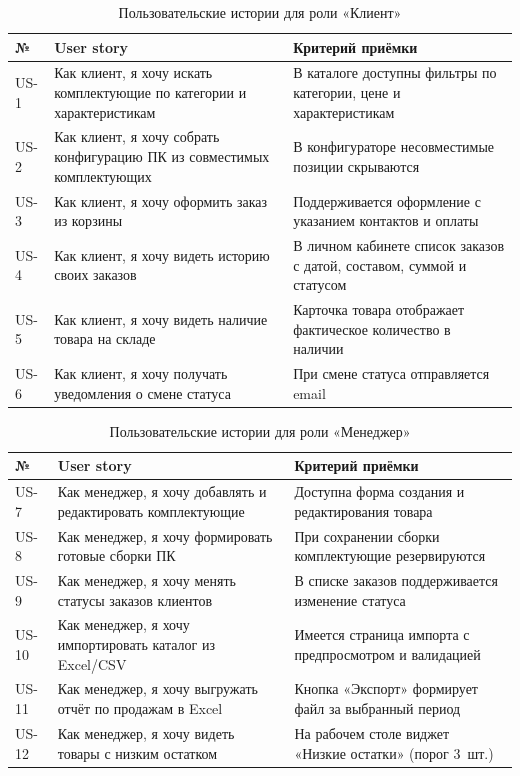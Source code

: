 \begin{table}[ht!]
\caption{Пользовательские истории для роли «Клиент»}
\label{tab:us-cli}
\small
\begin{tabularx}{\textwidth}{|>{\centering\arraybackslash}p{}|>{\RaggedRight\arraybackslash}X|>{\RaggedRight\arraybackslash}X|}
\hline
\textbf{№} & \textbf{User story} & \textbf{Критерий приёмки} \\ \hline
US-1 & Как клиент, я хочу искать комплектующие по категории и характеристикам & В каталоге доступны фильтры по категории, цене и характеристикам \\ \hline
US-2 & Как клиент, я хочу собрать конфигурацию ПК из совместимых комплектующих & В конфигураторе несовместимые позиции скрываются \\ \hline
US-3 & Как клиент, я хочу оформить заказ из корзины & Поддерживается оформление с указанием контактов и оплаты \\ \hline
US-4 & Как клиент, я хочу видеть историю своих заказов & В личном кабинете список заказов с датой, составом, суммой и статусом \\ \hline
US-5 & Как клиент, я хочу видеть наличие товара на складе & Карточка товара отображает фактическое количество в наличии \\ \hline
US-6 & Как клиент, я хочу получать уведомления о смене статуса & При смене статуса отправляется email \\ \hline
\end{tabularx}
\end{table}

\begin{table}[ht!]
\caption{Пользовательские истории для роли «Менеджер»}
\label{tab:us-mgr}
\small
\begin{tabularx}{\textwidth}{|>{\centering\arraybackslash}p{}|>{\RaggedRight\arraybackslash}X|>{\RaggedRight\arraybackslash}X|}
\hline
\textbf{№} & \textbf{User story} & \textbf{Критерий приёмки} \\ \hline
US-7 & Как менеджер, я хочу добавлять и редактировать комплектующие & Доступна форма создания и редактирования товара \\ \hline
US-8 & Как менеджер, я хочу формировать готовые сборки ПК & При сохранении сборки комплектующие резервируются \\ \hline
US-9 & Как менеджер, я хочу менять статусы заказов клиентов & В списке заказов поддерживается изменение статуса \\ \hline
US-10 & Как менеджер, я хочу импортировать каталог из Excel/CSV & Имеется страница импорта с предпросмотром и валидацией \\ \hline
US-11 & Как менеджер, я хочу выгружать отчёт по продажам в Excel & Кнопка «Экспорт» формирует файл за выбранный период \\ \hline
US-12 & Как менеджер, я хочу видеть товары с низким остатком & На рабочем столе виджет «Низкие остатки» (порог 3~шт.) \\ \hline
\end{tabularx}
\end{table}

